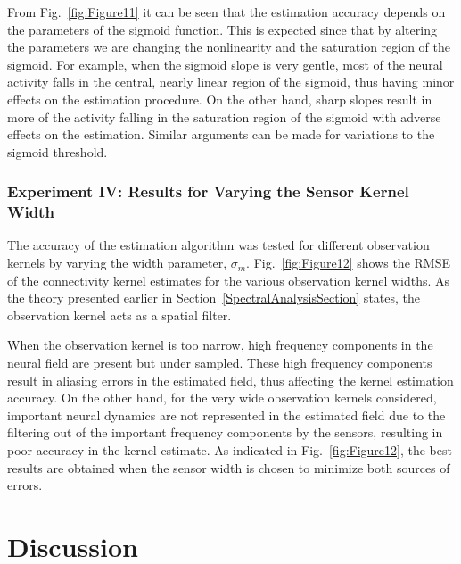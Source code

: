 \documentclass[5p,authoryear]{elsarticle}
\begin{document}
From Fig.~\ref{fig:Figure11} it can be seen that the estimation accuracy depends on the parameters of the sigmoid function. This is expected since that by altering the parameters we are changing the nonlinearity and the saturation region of the sigmoid. For example, when the sigmoid slope is very gentle, most of the neural activity falls in the central, nearly linear region of the sigmoid, thus having minor effects on the estimation procedure. On the other hand, sharp slopes result in more of the activity falling in the saturation region of the sigmoid with adverse effects on the estimation. Similar arguments can be made for variations to the sigmoid threshold.

\subsubsection{Experiment IV: Results for Varying the Sensor Kernel Width}
The accuracy of the estimation algorithm was tested for different observation kernels by varying the width parameter, $\sigma_m$. Fig.~\ref{fig:Figure12} shows the RMSE of the connectivity kernel estimates for the various observation kernel widths. As the theory presented earlier in Section~\ref{SpectralAnalysisSection} states, the observation kernel acts as a spatial filter. 

When the observation kernel is too narrow, high frequency components in the neural field are present but under sampled. These high frequency components result in aliasing errors in the estimated field, thus affecting the kernel estimation accuracy. On the other hand, for the very wide observation kernels considered, important neural dynamics are not represented in the estimated field due to the filtering out of the important frequency components by the sensors, resulting in poor accuracy in the kernel estimate. As indicated in Fig.~\ref{fig:Figure12}, the best results are obtained when the sensor width is chosen to minimize both sources of errors.

\section{Discussion}\label{DiscussionSection}
\end{document}
